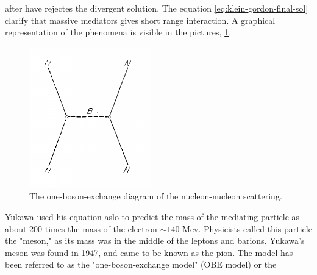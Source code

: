 \documentclass[12pt,a4paper]{book}
\begin{document}
	after have rejectes the divergent solution. The equation \ref{eq:klein-gordon-final-sol} clarify that massive mediators gives short range interaction. A graphical representation of the phenomena is visible in the pictures, \ref{fig:one_boson_exchange}.
	\begin{figure}[ht]
		\centering
		\includegraphics[width=0.7\linewidth]{pictures/one_boson_exchange.png}
		\caption{The one-boson-exchange diagram of the nucleon-nucleon scattering.}
		\label{fig:one_boson_exchange} 
	\end{figure}
	Yukawa used his equation aslo to predict the mass of the mediating particle as about 200 times the mass of the electron $\sim 140$ Mev. Physicists called this particle the "meson," as its mass was in the middle of the leptons and barions. Yukawa's meson was found in 1947, and came to be known as the pion.
	The model has been referred to as the "one-boson-exchange model" (OBE model) or the
\end{document}
